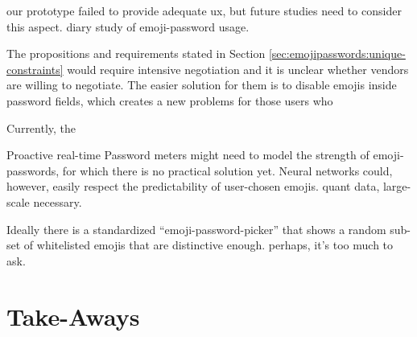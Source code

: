 our prototype failed to provide adequate ux, but future studies need to consider this aspect. diary study of emoji-password usage. 

The propositions and requirements stated in Section \ref{sec:emojipasswords:unique-constraints} would require intensive negotiation and it is unclear whether vendors are willing to negotiate. The easier solution for them is to disable emojis inside password fields, which creates a new problems for those users who

Currently, the 

Proactive real-time Password meters might need to model the strength of emoji-passwords, for which there is no practical solution yet. Neural networks could, however, easily respect the predictability of user-chosen emojis. quant data, large-scale necessary.

Ideally there is a standardized ``emoji-password-picker'' that shows a random sub-set of whitelisted emojis that are distinctive enough. perhaps, it's too much to ask.


\section{Take-Aways}
